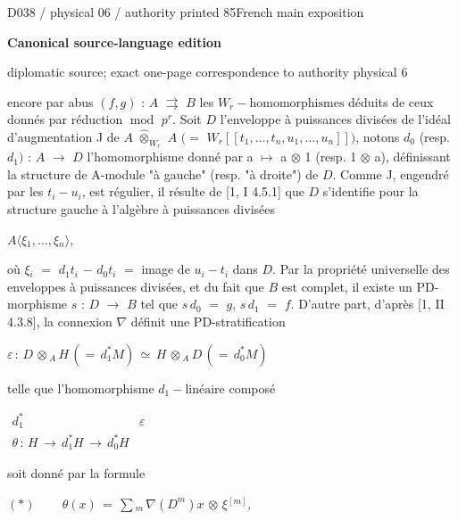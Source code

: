 \documentclass[9pt]{article}
\newcommand{\CanonText}[1]{\par{\fontsize{8.0}{9.35}\selectfont\RaggedRight #1\par}\vspace{2.2pt}}
\newcommand{\CanonDisplay}[1]{\par\vspace{1.2pt}\begin{center}{\fontsize{7.2}{8.4}\selectfont\(\displaystyle #1\)}\end{center}\vspace{1.2pt}}
\newenvironment{CanonMathBlock}{\par\vspace{1.2pt}\begin{center}\fontsize{6.8}{8.0}\selectfont\(\displaystyle}{\)\end{center}\vspace{1.2pt}}
\newcommand{\LayerTitle}{Canonical source-language edition}
\begin{document}
\noindent\begin{minipage}[t][\dimexpr\textheight-5pt\relax][t]{\textwidth}
{\sffamily\fontsize{7.3}{8.2}\selectfont\color{Quiet} D038 / physical 06 / authority printed 85\hfill French main exposition}
\par{}\vspace{4.5pt}
{\sffamily\fontsize{10.4}{11.6}\selectfont\bfseries\color{Accent} \LayerTitle}
\par{\sffamily\fontsize{6.7}{7.7}\selectfont\color{Quiet} diplomatic source; exact one-page correspondence to authority physical 6}
\vspace{5pt}
\CanonText{encore par abus \((f,g)\) : \(A\) \(\rightrightarrows{}\) \(B\) les \(W_{r}-\text{homomorphismes}\) déduits de ceux donnés par réduction \(\operatorname{mod}\) \(p^{r}\). Soit \(D\) l'enveloppe à puissances divisées de l'idéal d'augmentation J de \(A\) \(\widehat{\otimes}_{W_{r}}\) \(A\) \((=\) \(W_{r}[[t_{1},\ldots{},t_{n},u_{1},\ldots{},u_{n}]])\), notons \(d_{0}\) (resp. \(d_{1})\) : \(A\) \(\to{}\) \(D\) l'homomorphisme donné par a \(\mapsto{}\) a \(\otimes{}\) 1 (resp. 1 \(\otimes{}\) a), définissant la structure de A-module "à gauche" (resp. "à droite") de \(D\). Comme J, engendré par les \(t_{i}-u_{i}\), est régulier, il résulte de [1, I 4.5.1] que \(D\) s'identifie pour la structure gauche à l'algèbre à puissances divisées}
\CanonText{\(A\langle{}\xi{}_{1},\ldots{},\xi{}_{n}\rangle{}\),}
\CanonText{où \(\xi{}_{i}\) \(=\) \(d_{1}t_{i}\) \(-\) \(d_{0}t_{i}\) \(=\) image de \(u_{i}-t_{i}\) dans \(D\). Par la propriété universelle des enveloppes à puissances divisées, et du fait que \(B\) est complet, il existe un PD-morphisme \(s\) : \(D\) \(\to{}\) \(B\) tel que \(s\,d_{0}\) \(=\) \(g\), \(s\,d_{1}\) \(=\) \(f\). D'autre part, d'après [1, II 4.3.8], la connexion \(\nabla{}\) définit une PD-stratification}
\CanonDisplay{\varepsilon{}\,:\,D\,\otimes{}_{A}\,H\,(=\,d_{1}^{*}M)\,\simeq{}\,H\,\otimes{}_{A}\,D\,(=\,d_{0}^{*}M)}
\CanonText{telle que l'homomorphisme \(d_{1}-\text{linéaire}\) composé}
\begin{CanonMathBlock}
\begin{array}{cc}
d_{1}^{*} & \varepsilon{}\\
\theta{}\,:\,H\,\longrightarrow{}\,d_{1}^{*}H\,\longrightarrow{}\,d_{0}^{*}H & {}
\end{array}
\end{CanonMathBlock}
\CanonText{soit donné par la formule}
\CanonDisplay{(*)\qquad\,\theta{}(x)\,=\,\sum{}_{m}\,\nabla{}(D^{m})x\,\otimes{}\,\xi{}^{[m]},}

\end{minipage}
\end{document}
